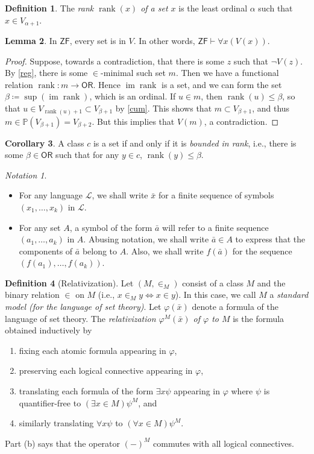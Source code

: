 \documentclass[10pt,letterpaper,cm]{nupset}
\theoremstyle{definition}
\newtheorem{definition}{Definition}[subsection]
\theoremstyle{theorem}
\newtheorem{lemma}[definition]{Lemma}
\newtheorem{corollary}[definition]{Corollary}
\theoremstyle{remark}
\newtheorem*{notation}{Notation}
\renewcommand{\L}{\mathcal L}
\renewcommand{\P}{\mathbb P}
\newcommand{\1}{\mathbf{1}}
\newcommand{\0}{\vec 0}
\newcommand{\zf}{\mathsf{ZF}}
\newcommand{\ord}{\mathsf{OR}}
\DeclareMathOperator{\im}{im}
\DeclareMathOperator{\rnk}{rank}
\newcommand{\bi}{\begin{itemize}}
\newcommand{\ei}{\end{itemize}}
\newcommand{\be}{\begin{enumerate}}
\newcommand{\ee}{\end{enumerate}}
\begin{document}
\begin{definition}
The \textit{rank $\rnk(x)$ of a set $x$} is the least ordinal $\alpha$ such that $x\in V_{\alpha +1}$.
\end{definition}

\begin{lemma}
In $\zf$, every set is in $V$. In other words, $\zf \vdash \forall x(V(x))$.
\end{lemma}
\begin{proof}
Suppose, towards a contradiction, that there is some $z$ such that $\neg{V(z)}$. By \cref{reg}, there is some $\in$-minimal such set $m$. Then we have a functional relation $\rnk :  m \to \ord$. Hence $\im{\rnk}$ is a set, and we can form the set $\beta \coloneqq \sup(\im{\rnk})$, which is an ordinal. If $u \in m$, then $\rnk(u) \leq \beta$, so that $u \in V_{\rnk(u)+1} \subset V_{\beta +1}$ by \cref{cum}. This shows that $m\subset  V_{\beta +1}$, and thus $m \in \P(V_{\beta +1}) = V_{\beta +2}$. But this implies that $V(m)$, a contradiction. 
\end{proof}

\begin{corollary}
A class $c$ is a set if and only if it is \textit{bounded in rank}, i.e., there is some $\beta \in \ord$ such that for any $y\in c$, $\rnk(y) \leq \beta$.
\end{corollary}

\begin{notation} $ $
\bi
\item For any language $\L$, we shall write $\bar{x}$ for a finite sequence of symbols $\left(x_1, \ldots, x_k\right)$ in $\L$.  
\item For any set $A$, a symbol of the form $\bar{a}$ will refer to a finite sequence $\left(a_1, \ldots, a_k\right)$  in $A$. Abusing notation, we shall  write $\bar{a} \in A$ to express that the components of $\bar{a}$ belong to $A$. Also, we shall write $f(\bar{a})$ for the sequence $\left(f(a_1), \ldots, f(a_k)\right)$.
\ei
\end{notation}

\begin{definition}[Relativization]
Let $\left(M, \in_M\right)$ consist of a class $M$ and the binary relation $\in$ on $M$ (i.e., $x \in_M y \iff x\in y$). In this case, we call $M$ a \textit{standard model (for the language of set theory)}. Let $\varphi(\bar{x})$ denote a formula of the language of set theory. The \textit{relativization $\varphi^M(\bar{x})$ of $\varphi$ to $M$} is the formula obtained inductively  by 
\be[label=(\alph*)]
\item  fixing each atomic formula appearing in $\varphi$,
\item preserving each logical connective  appearing in $\varphi$,
\item translating each formula of the form $\exists x \psi$ appearing in $\varphi$ where $\psi$ is quantifier-free  to $\left(\exists x \in M \right)\psi^M$, and 
\item similarly translating $\forall x \psi$  to $\left(\forall x \in M\right)\psi^M$.
\ee Part (b) says that the operator $\left({-}\right)^M$ commutes with all logical connectives. 
\end{definition}
\end{document}
